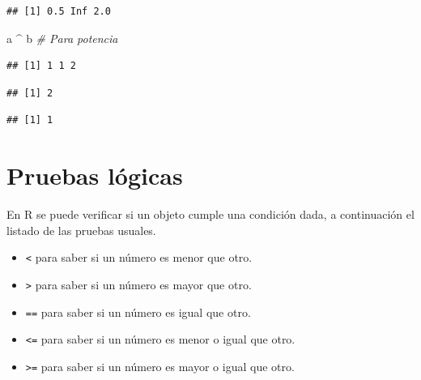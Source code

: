 \documentclass[10pt,]{krantz}
\makeatletter
\newenvironment{Shaded}{\begin{snugshade}}{\end{snugshade}}
\newcommand{\DecValTok}[1]{\textcolor[rgb]{0.00,0.00,0.81}{{#1}}}
\newcommand{\StringTok}[1]{\textcolor[rgb]{0.31,0.60,0.02}{{#1}}}
\newcommand{\CommentTok}[1]{\textcolor[rgb]{0.56,0.35,0.01}{\textit{{#1}}}}
\newcommand{\NormalTok}[1]{{#1}}
\providecommand{\tightlist}{%
  \setlength{\itemsep}{0pt}\setlength{\parskip}{0pt}}
\let\proglang=\textsf
\newenvironment{kframe}{%
\medskip{}
\setlength{\fboxsep}{.8em}
 \def\at@end@of@kframe{}%
 \ifinner\ifhmode%
  \def\at@end@of@kframe{\end{minipage}}%
  \begin{minipage}{\columnwidth}%
 \fi\fi%
 \def\FrameCommand##1{\hskip\@totalleftmargin \hskip-\fboxsep
 \colorbox{shadecolor}{##1}\hskip-\fboxsep
     \hskip-\linewidth \hskip-\@totalleftmargin \hskip\columnwidth}%
 \MakeFramed {\advance\hsize-\width
   \@totalleftmargin\z@ \linewidth\hsize
   \@setminipage}}%
 {\par\unskip\endMakeFramed%
 \at@end@of@kframe}
\renewenvironment{Shaded}{\begin{kframe}}{\end{kframe}}
\makeatother
\begin{document}
\begin{verbatim}
## [1] 0.5 Inf 2.0
\end{verbatim}

\begin{Shaded}
\begin{Highlighting}[]
\NormalTok{a ^}\StringTok{ }\NormalTok{b  }\CommentTok{# Para potencia}
\end{Highlighting}
\end{Shaded}

\begin{verbatim}
## [1] 1 1 2
\end{verbatim}

\begin{Shaded}
\end{Shaded}

\begin{verbatim}
## [1] 2
\end{verbatim}

\begin{Shaded}
\end{Shaded}

\begin{verbatim}
## [1] 1
\end{verbatim}

\section{\texorpdfstring{Pruebas lógicas
}{Pruebas lógicas }}\label{pruebas-logicas}

En \proglang{R} se puede verificar si un objeto cumple una condición
dada, a continuación el listado de las pruebas usuales.

\begin{itemize}
\tightlist
\item
  \texttt{\textless{}} para saber si un número es menor que otro.
\item
  \texttt{\textgreater{}} para saber si un número es mayor que otro.
\item
  \texttt{==} para saber si un número es igual que otro.
\item
  \texttt{\textless{}=} para saber si un número es menor o igual que
  otro.
\item
  \texttt{\textgreater{}=} para saber si un número es mayor o igual que
  otro.
\end{itemize}
\end{document}
